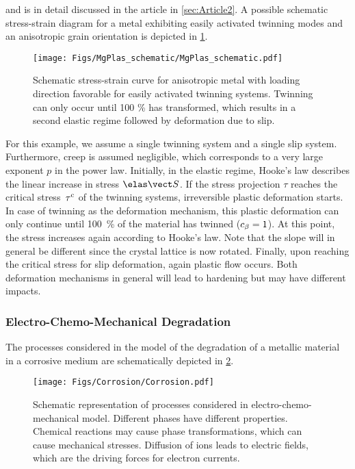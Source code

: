 and is in detail discussed in the article in \cref{sec:Article2}. A possible schematic stress-strain diagram for a metal exhibiting easily activated twinning modes and an anisotropic grain orientation is depicted in \cref{fig:MgPlas}.
\begin{figure}[h!]
  \centering
  \texttt{[image: Figs/MgPlas\_schematic/MgPlas\_schematic.pdf]}
  \caption{Schematic stress-strain curve for anisotropic metal with loading direction favorable for easily activated twinning systems. Twinning can only occur until 100 \% has transformed, which results in a second elastic regime followed by deformation due to slip. }
  \label{fig:MgPlas}
\end{figure}

For this example, we assume a single twinning system and a single slip system. Furthermore, creep is assumed negligible, which corresponds to a very large exponent $p$ in the power law. Initially, in the elastic regime, Hooke's law describes the linear increase in stress $\SSe$. If the stress projection $\tau$ reaches the critical stress~$\tau^{\rm c}$ of the twinning systems, irreversible plastic deformation starts. In case of twinning as the deformation mechanism, this plastic deformation can only continue until 100~\% of the material has twinned (\mbox{$c_{\beta}=1$}). At this point, the stress increases again according to Hooke's law. Note that the slope will in general be different since the crystal lattice is now rotated. Finally, upon reaching the critical stress for slip deformation, again plastic flow occurs. Both deformation mechanisms in general will lead to hardening but may have different impacts.

\subsubsection{Electro-Chemo-Mechanical Degradation}
The processes considered in the model of the degradation of a metallic material in a corrosive medium are schematically depicted in \cref{fig:Corrosion}.
\begin{figure}[h!]
  \centering
  \texttt{[image: Figs/Corrosion/Corrosion.pdf]}
  \caption{Schematic representation of processes considered in electro-chemo-mechanical model. Different phases have different properties. Chemical reactions may cause phase transformations, which can cause mechanical stresses. Diffusion of ions leads to electric fields, which are the driving forces for electron currents.}
  \label{fig:Corrosion}
\end{figure}

